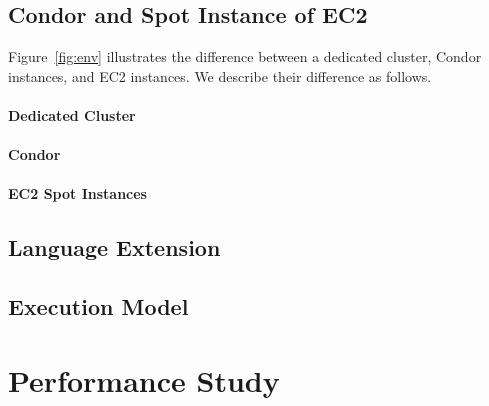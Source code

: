\documentclass[11pt]{article}
\begin{document}
\subsection{Condor and Spot Instance of EC2}

Figure~\ref{fig:env} illustrates the difference between
a dedicated cluster, Condor instances, and EC2 instances.
We describe their difference as follows.

\paragraph*{Dedicated Cluster}


\paragraph*{Condor}


\paragraph*{EC2 Spot Instances}


\subsection{Language Extension}

\subsection{Execution Model}

\section{Performance Study}



\end{document}
